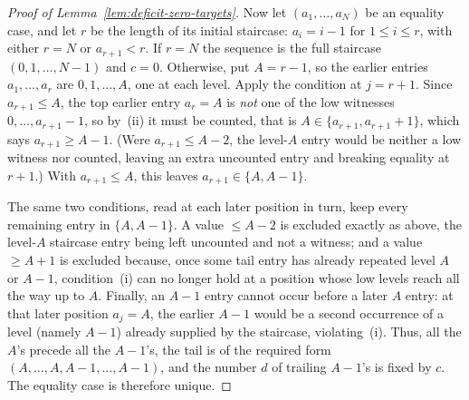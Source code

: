 \documentclass[11pt]{article}
\theoremstyle{definition}
\begin{document}
\begin{proof}[Proof of Lemma~\ref{lem:deficit-zero-targets}]
Now let $(a_1,\ldots,a_N)$ be an equality case, and let $r$ be the length of its
initial staircase: $a_i=i-1$ for $1\le i\le r$, with either $r=N$ or
$a_{r+1}<r$.  If $r=N$ the sequence is the full staircase $(0,1,\ldots,N-1)$ and
$c=0$.  Otherwise, put $A=r-1$, so the earlier entries $a_1,\ldots,a_r$ are
$0,1,\ldots,A$, one at each level.  Apply the condition at $j=r+1$.  Since
$a_{r+1}\le A$, the top earlier entry $a_r=A$ is \emph{not} one of the low
witnesses $0,\ldots,a_{r+1}-1$, so by~(ii) it must be counted, that is
$A\in\{a_{r+1},a_{r+1}+1\}$, which says $a_{r+1}\ge A-1$.  (Were
$a_{r+1}\le A-2$, the level-$A$ entry would be neither a low witness nor counted,
leaving an extra uncounted entry and breaking equality at $r+1$.)  With
$a_{r+1}\le A$, this leaves $a_{r+1}\in\{A,A-1\}$.

The same two conditions, read at each later position in turn, keep every
remaining entry in $\{A,A-1\}$.  A value $\le A-2$ is excluded exactly as above,
the level-$A$ staircase entry being left uncounted and not a witness; and a value
$\ge A+1$ is excluded because, once some tail entry has already repeated level
$A$ or $A-1$, condition~(i) can no longer hold at a position whose low levels
reach all the way up to $A$.  Finally, an $A-1$ entry cannot occur before a later
$A$ entry: at that later position $a_j=A$, the earlier $A-1$ would be a second
occurrence of a level (namely $A-1$) already supplied by the staircase,
violating~(i).  Thus, all the $A$'s precede all the $A-1$'s, the tail is
of the required form $(A,\ldots,A,A-1,\ldots,A-1)$, and the number $d$ of trailing
$A-1$'s is fixed by $c$.  The equality case is therefore unique.
\end{proof}
\end{document}
